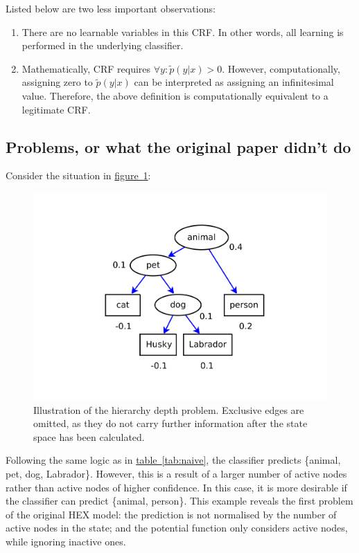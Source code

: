 \documentclass[11pt,a4paper]{article}
\begin{document}
Listed below are two less important observations:
\begin{enumerate}
\item There are no learnable variables in this CRF. In other words, all learning is performed in the underlying classifier.
\item Mathematically, CRF requires $\forall y:\tilde{p}(y|x)>0$. However, computationally, assigning zero to $\tilde{p}(y|x)$ can be interpreted as assigning an infinitesimal value. Therefore, the above definition is computationally equivalent to a legitimate CRF.
\end{enumerate}

\subsection{Problems, or what the original paper didn't do}
\label{sec:problem}

Consider the situation in \hyperref[fig:depth]{figure~\ref{fig:depth}}:
\begin{figure}[h]
\centering\includegraphics[scale=0.5]{depth.pdf}
\caption{Illustration of the hierarchy depth problem. Exclusive edges are omitted, as they do not carry further information after the state space has been calculated.}
\label{fig:depth}
\end{figure}

Following the same logic as in \hyperref[tab:naive]{table~\ref{tab:naive}}, the classifier predicts \{animal, pet, dog, Labrador\}. However, this is a result of a larger number of active nodes rather than active nodes of higher confidence. In this case, it is more desirable if the classifier can predict \{animal, person\}. This example reveals the first problem of the original HEX model: the prediction is not normalised by the number of active nodes in the state; and the potential function only considers active nodes, while ignoring inactive ones.
\end{document}
